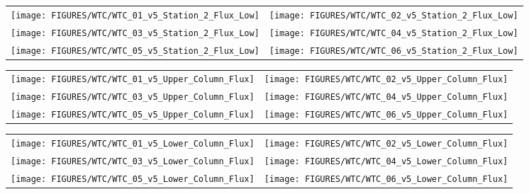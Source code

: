 \begin{figure}[p]
\begin{tabular*}{\textwidth}{l@{\extracolsep{\fill}}r}
\texttt{[image: FIGURES/WTC/WTC\_01\_v5\_Station\_2\_Flux\_Low]} &
\texttt{[image: FIGURES/WTC/WTC\_02\_v5\_Station\_2\_Flux\_Low]} \\
\texttt{[image: FIGURES/WTC/WTC\_03\_v5\_Station\_2\_Flux\_Low]} &
\texttt{[image: FIGURES/WTC/WTC\_04\_v5\_Station\_2\_Flux\_Low]} \\
\texttt{[image: FIGURES/WTC/WTC\_05\_v5\_Station\_2\_Flux\_Low]} &
\texttt{[image: FIGURES/WTC/WTC\_06\_v5\_Station\_2\_Flux\_Low]}
\end{tabular*}
\label{NIST_WTC_Station_2_Flux_Low}
\end{figure}

\begin{figure}[p]
\begin{tabular*}{\textwidth}{l@{\extracolsep{\fill}}r}
\texttt{[image: FIGURES/WTC/WTC\_01\_v5\_Upper\_Column\_Flux]} &
\texttt{[image: FIGURES/WTC/WTC\_02\_v5\_Upper\_Column\_Flux]} \\
\texttt{[image: FIGURES/WTC/WTC\_03\_v5\_Upper\_Column\_Flux]} &
\texttt{[image: FIGURES/WTC/WTC\_04\_v5\_Upper\_Column\_Flux]} \\
\texttt{[image: FIGURES/WTC/WTC\_05\_v5\_Upper\_Column\_Flux]} &
\texttt{[image: FIGURES/WTC/WTC\_06\_v5\_Upper\_Column\_Flux]}
\end{tabular*}
\label{NIST_WTC_Upper_Column_Flux}
\end{figure}

\begin{figure}[p]
\begin{tabular*}{\textwidth}{l@{\extracolsep{\fill}}r}
\texttt{[image: FIGURES/WTC/WTC\_01\_v5\_Lower\_Column\_Flux]} &
\texttt{[image: FIGURES/WTC/WTC\_02\_v5\_Lower\_Column\_Flux]} \\
\texttt{[image: FIGURES/WTC/WTC\_03\_v5\_Lower\_Column\_Flux]} &
\texttt{[image: FIGURES/WTC/WTC\_04\_v5\_Lower\_Column\_Flux]} \\
\texttt{[image: FIGURES/WTC/WTC\_05\_v5\_Lower\_Column\_Flux]} &
\texttt{[image: FIGURES/WTC/WTC\_06\_v5\_Lower\_Column\_Flux]}
\end{tabular*}
\label{NIST_WTC_Lower_Column_Flux}
\end{figure}


